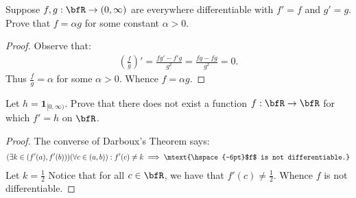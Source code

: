 \documentclass[11pt,twoside,openany]{memoir}
\begin{document}
    \begin{exercise}
        Suppose $f,g:\bfR \rightarrow (0,\infty)$ are everywhere differentiable with $f' = f$ and $g' = g$. Prove that $f = \alpha g$ for some constant $\alpha > 0$.
    \end{exercise}
        \begin{proof}
            Observe that:
                \begin{equation*}
                \begin{split}
                    \left(\frac{f}{g}\right)' = \frac{fg'-f'g}{g^2} = \frac{fg-fg}{g^2} = 0.
                \end{split}
                \end{equation*}
            Thus $\frac{f}{g} = \alpha$ for some $\alpha > 0$. Whence $f = \alpha g$.
        \end{proof}
    \begin{exercise}
        Let $h = \mathbf{1}_{[0,\infty)}$. Prove that there does not exist a function $f:\bfR \rightarrow \bfR$ for which $f' = h$ on $\bfR$.
    \end{exercise}
        \begin{proof}
            The converse of Darboux's Theorem says:
                \begin{equation*}
                \begin{split}
                    (\exists k \in (f'(a),f'(b)))(\forall c \in (a,b)) : f'(c) \neq k \implies \mtext{\hspace{-6pt}$f$ is not differentiable.}
                \end{split}
                \end{equation*}
            Let $k = \frac{1}{2}$ Notice that for all $c \in \bfR$, we have that $f'(c) \neq \frac{1}{2}$. Whence $f$ is not differentiable.
        \end{proof}
\end{document}
